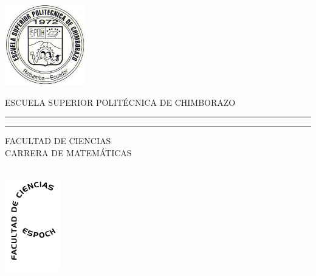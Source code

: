 \documentclass[12pt,a4paper,oneside]{book}
\author{Daniel Alejandro Reinoso Salas\\ César Daniel Reinoso Reinoso}
\begin{document}
\begin{titlepage}
    \thispagestyle{empty}
    \begin{minipage}[c][0.17\textheight][c]{0.25\textwidth}
        \begin{center}
            \includegraphics[width=3.5cm, height=3.5cm]{images.jpg}
        \end{center}
    \end{minipage}
    \begin{minipage}[c][0.195\textheight][t]{0.75\textwidth}
        \begin{center}
            \vspace{0.3cm}
            \textsc{\large ESCUELA SUPERIOR POLITÉCNICA DE CHIMBORAZO}\\[0.5cm]
            \vspace{0.3cm}
            \hrule height2.5pt
            \vspace{.2cm}
            \hrule height1pt
            \vspace{.8cm}
            \textsc{FACULTAD DE CIENCIAS\\
                CARRERA DE MATEMÁTICAS }\\[0.5cm] %
        \end{center}
    \end{minipage}

    \begin{minipage}[c][0.81\textheight][t]{0.25\textwidth}
        \vspace*{5mm}
        \begin{center}
            \hskip2.0mm
            \vrule width1pt height13cm
            \vspace{5mm}
            \hskip2pt
            \vrule width2.5pt height13cm
            \hskip2mm
            \vrule width1pt height13cm \\
            \vspace{5mm}
            \includegraphics[height=4.0cm]{logo-blanco (1).png}
        \end{center}
    \end{minipage}
    \begin{minipage}[c][0.81\textheight][t]{0.75\textwidth}
        \begin{center}
            \vspace{1cm}


\end{center}
\end{minipage}
\end{titlepage}
\end{document}
